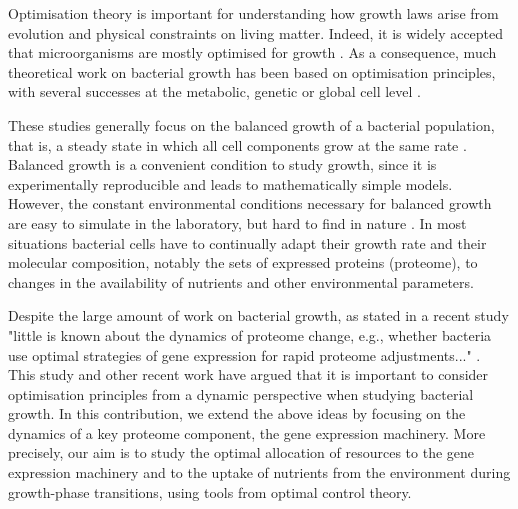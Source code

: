 \documentclass[10pt, conference]{ieeeconf}      %
\begin{document}
Optimisation theory is important for understanding how growth laws arise from evolution and physical constraints on living matter.
Indeed, it is widely accepted that microorganisms are mostly optimised for growth \cite{dekel_optimality_2005}.
As a consequence, much theoretical work on bacterial growth has been based on optimisation principles, with several successes at the metabolic, genetic or global cell level \cite{edwards_escherichia_2000, molenaar_shifts_2009}.

These studies generally focus on the balanced growth of a bacterial population, that is, a steady state in which all cell components grow at the same rate \cite{neidhardt_physiology_1990}.
Balanced growth is a convenient condition to study growth, since it is experimentally reproducible and leads to mathematically simple models.
However, the constant environmental conditions necessary for balanced growth are easy to simulate in the laboratory, but hard to find in nature \cite{neidhardt_physiology_1990}.
In most situations bacterial cells have to continually adapt their growth rate and their molecular composition, notably the sets of expressed proteins (proteome), to changes in the availability of nutrients and other environmental parameters.

Despite the large amount of work on bacterial growth, as stated in a recent study "little is known about the dynamics of proteome change, e.g., whether bacteria use optimal strategies of gene expression for rapid proteome adjustments..." \cite{pavlov_optimal_2013}.
This study and other recent work \cite{ehrenberg_medium-dependent_2013} have argued that it is important to consider optimisation principles from a dynamic perspective when studying bacterial growth.
In this contribution, we extend the above ideas by focusing on the dynamics of a key proteome component, the gene expression machinery.
More precisely, our aim is to study the optimal allocation of resources to the gene expression machinery and to the uptake of nutrients from the environment during growth-phase transitions, using tools from optimal control theory.
\end{document}
